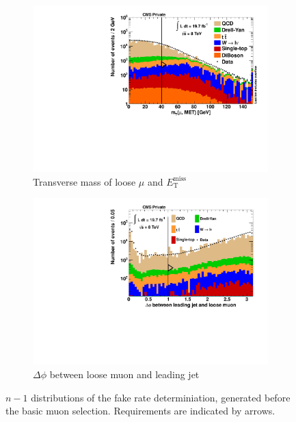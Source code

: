 \begin{figure}[!ht]
  \ContinuedFloat
  \centering
  \begin{subfigure}[b]{0.495\textwidth}
    \centering
    \includegraphics[width=\textwidth]{plots/nTL_mt.pdf}
    \caption{Transverse mass of loose $\mu$ and $E_{\text{T}}^{\text{miss}}$ \label{fig:ntlmt}}
  \end{subfigure}
  \begin{subfigure}[b]{0.495\textwidth}
    \centering
    \includegraphics[width=\textwidth]{plots/nTL_jetdphi.pdf}
    \caption{$\Delta \phi$ between loose muon and leading jet \label{fig:ntljetdphi}}
  \end{subfigure}

  \caption{$n - 1$ distributions of the fake rate determiniation, generated before the basic muon selection. Requirements are indicated by arrows.}
  \label{fig:ntl}
\end{figure}

